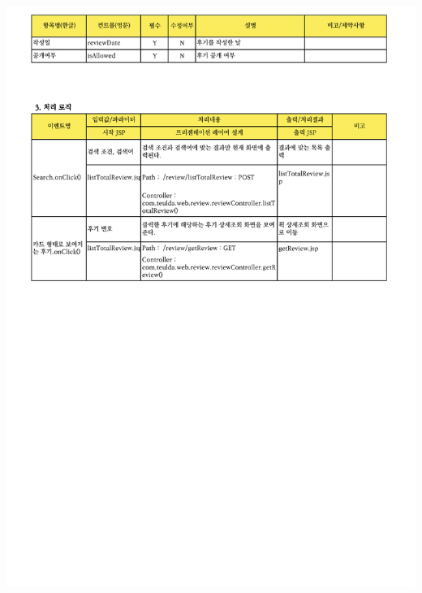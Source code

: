 {{{{{{{{{{{{{{{{{{{{{{{{{{{{{{{{{{{{{{{{{{{{{{{{{{{{{{{{{{{{{{{{{{{{{{{{{{{{{{{{{\includegraphics[width=20cm]{./Figure/Design/Display/totalSearch/totalSearch_04.pdf} \\
}}}}}}}}}}}}}}}}}}}}}}}}}}}}}}}}}}}}}}}}}}}}}}}}}}}}}}}}}}}}}}}}}}}}}}}}}}}}}}}}}
